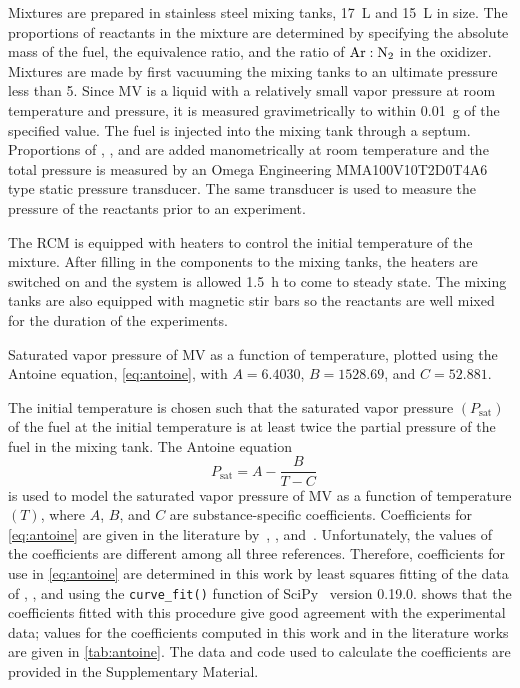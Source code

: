 \documentclass[letterpaper, review, sort&compress]{elsarticle}
\newcommand*{\logten}{\mathop{\log_{10}}}
\begin{document}
Mixtures are prepared in stainless steel mixing tanks, \SI{17}{\L} and \SI{15}{\L} in size. The
proportions of reactants in the mixture are determined by specifying the absolute mass of the fuel,
the equivalence ratio, and the ratio of \(\ce{Ar}:\ce{N2}\) in the oxidizer. Mixtures are
made by first vacuuming the mixing tanks to an ultimate pressure less than \SI{5}{\torr}. Since MV
is a liquid with a relatively small vapor pressure at room temperature and pressure, it is measured
gravimetrically to within \SI{0.01}{\g} of the specified value. The fuel is injected into the mixing
tank through a septum. Proportions of , , and  are added manometrically at room
temperature and the total pressure is measured by an Omega Engineering MMA100V10T2D0T4A6 type static
pressure transducer. The same transducer is used to measure the pressure of the reactants prior to
an experiment.

The RCM is equipped with heaters to control the initial temperature of the mixture. After filling in
the components to the mixing tanks, the heaters are switched on and the system is allowed
\SI{1.5}{\hour} to come to steady state. The mixing tanks are also equipped with magnetic stir bars
so the reactants are well mixed for the duration of the experiments.

\begin{center}
    \captionsetup{type=figure}
    
    \caption{Saturated vapor pressure of MV as a function of temperature,
    plotted using the Antoine equation, \cref{eq:antoine}, with
    \(A=6.4030\), \(B=1528.69\), and \(C=52.881\).}
    \label{fig:vapor-pressure}
\end{center}

The initial temperature is chosen such that the saturated vapor pressure \((P_{\text{sat}})\) of the
fuel at the initial temperature is at least twice the partial pressure of the fuel in the mixing
tank. The Antoine equation
%
\begin{equation}\label{eq:antoine}
    \logten{P_{\text{sat}}} = A - \frac{B}{T - C}
\end{equation}
%
is used to model the saturated vapor pressure of MV as a function of temperature \((T)\), where
\(A\), \(B\), and \(C\) are substance-specific coefficients. Coefficients for \cref{eq:antoine} are
given in the literature by~\citet{Ortega2003}, \citet{Camacho2007}, and~\citet{Stephenson1987}.
Unfortunately, the values of the coefficients are different among all three references. Therefore,
coefficients for use in \cref{eq:antoine} are determined in this work by least squares fitting of
the data of \citet{Ortega2003}, \citet{vanGenderen2002}, and \citet{Verevkin2008} using the
\verb|curve_fit()| function of SciPy~\cite{Jones2001} version 0.19.0. 
shows that the coefficients fitted with this procedure give good agreement with the experimental
data; values for the coefficients computed in this work and in the literature works are given in
\cref{tab:antoine}. The data and code used to calculate the coefficients are provided in the
Supplementary Material.
\end{document}
